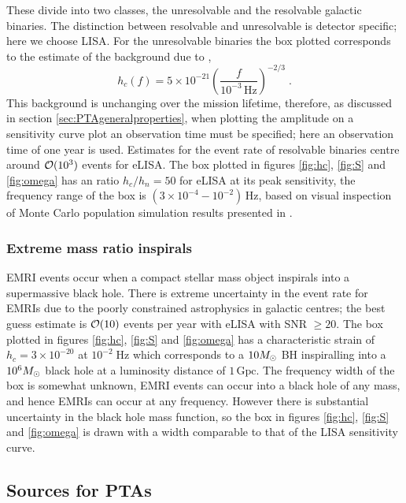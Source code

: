 These divide into two classes, the unresolvable and the resolvable galactic binaries. The distinction between resolvable and unresolvable is detector specific; here we choose LISA. For the unresolvable binaries the box plotted corresponds to the estimate of the background due to \cite{Nelemans},
\begin{equation} h_{c}(f)= 5\times 10^{-21} \left(\frac{f}{10^{-3}\,\textrm{Hz}}\right)^{-2/3} \; . \end{equation}
This background is unchanging over the mission lifetime, therefore, as discussed in section \ref{sec:PTAgeneralproperties}, when plotting the amplitude on a sensitivity curve plot an observation time must be specified; here an observation time of one year is used. Estimates for the event rate of resolvable binaries centre around ${\cal{O}}(10^{3})$ events for eLISA. The box plotted in figures \ref{fig:hc}, \ref{fig:S} and \ref{fig:omega} has an ratio $h_{c}/h_{n}=50$ for eLISA at its peak sensitivity, the frequency range of the box is $\left(3\times10^{-4}-10^{-2}\right)\,\textrm{Hz}$, based on visual inspection of Monte Carlo population simulation results presented in \cite{Amaro-Seoane-et-al}.

\subsubsection{Extreme mass ratio inspirals}
EMRI events occur when a compact stellar mass object inspirals into a supermassive black hole. There is extreme uncertainty in the event rate for EMRIs due to the poorly constrained astrophysics in galactic centres; the best guess estimate is ${\cal{O}}(10)$ events per year with eLISA with SNR $\ge 20$. The box plotted in figures \ref{fig:hc}, \ref{fig:S} and \ref{fig:omega} has a characteristic strain of $h_{c}=3\times 10^{-20}$ at $10^{-2}\;\textrm{Hz}$ which corresponds to a $10M_{ \odot }$ BH inspiralling into a $10^{6}M_{ \odot }$ black hole at a luminosity distance of $1\,\textrm{Gpc}$. The frequency width of the box is somewhat unknown, EMRI events can occur into a black hole of any mass, and hence EMRIs can occur at any frequency. However there is substantial uncertainty in the black hole mass function, so the box in figures \ref{fig:hc}, \ref{fig:S} and \ref{fig:omega} is drawn with a width comparable to that of the LISA sensitivity curve.




\subsection{Sources for PTAs}


